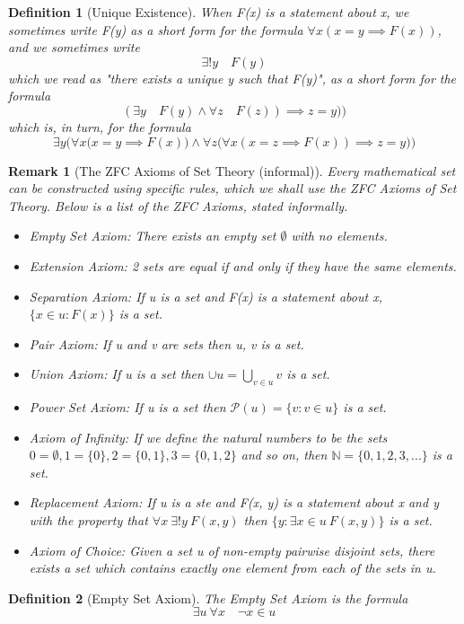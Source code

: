 \documentclass[11pt, oneside]{book}
\theoremstyle{break}
\newtheorem*{remark}{Remark}
\newtheorem{defn}{Definition}[section]
\newcommand{\bb}[1]{\mathbb{#1}}			%
\begin{document}
\begin{defn}[Unique Existence]
	When F(x) is a statement about x, we sometimes write F(y) as a short form for the formula $\forall x(x=y\implies F(x))$, and we sometimes write
	\[
		\exists!y \quad F(y)
	\]
	which we read as "there exists a unique y such that F(y)", as a short form for the formula
	\[
		(\exists y \quad F(y) \land \forall z \quad F(z)) \implies z = y))
	\] which is, in turn, for the formula
	\[
		\exists y \bigg( \forall x \Big(x = y \implies F(x) \Big) \land \forall z \Big(\forall x (x = z \implies F(x)) \implies z = y \Big) \bigg)
	\]
\end{defn}

\begin{remark}[The ZFC Axioms of Set Theory (informal)]
	Every mathematical set can be constructed using specific rules, which we shall use the ZFC Axioms of Set Theory. Below is a list of the ZFC Axioms, stated informally.
	\begin{itemize}
		\item Empty Set Axiom: There exists an empty set $\emptyset$ with no elements.
		\item Extension Axiom: 2 sets are equal if and only if they have the same elements.
		\item Separation Axiom: If u is a set and F(x) is a statement about x, $\{x \in u : F(x)\}$ is a set.
		\item Pair Axiom: If u and v are sets then {u, v} is a set.
		\item Union Axiom: If u is a set then $\cup u = \bigcup\limits_{v \in u} v$ is a set.
		\item Power Set Axiom: If u is a set then $\mathcal{P}(u) = \{v : v \in u\}$ is a set.
		\item Axiom of Infinity: If we define the natural numbers to be the sets $0 = \emptyset, 1 = \{0\}, 2 = \{0, 1\}, 3 = \{0, 1, 2\}$ and so on, then $\bb{N} = \{0, 1, 2, 3, ...\}$ is a set.
		\item Replacement Axiom: If u is a ste and F(x, y) is a statement about x and y with the property that $\forall x \> \exists! y \> F(x,y)$ then $\{y : \exists x \in u \> F(x,y)\}$ is a set.
		\item Axiom of Choice: Given a set u of non-empty pairwise disjoint sets, there exists a set which contains exactly one element from each of the sets in u.
	\end{itemize}
\end{remark}

\begin{defn}[Empty Set Axiom]
	The Empty Set Axiom is the formula
	\[
		\exists u \> \forall x \quad \neg x \in u
	\]
\end{defn}
\end{document}
